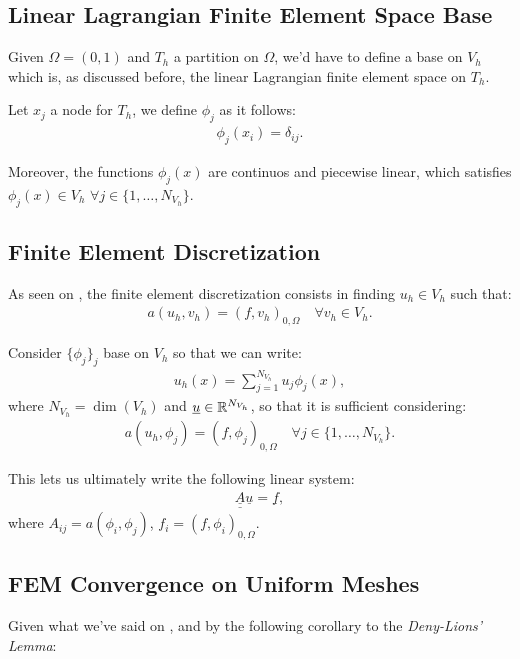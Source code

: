 \subsection{Linear Lagrangian Finite Element Space Base}

Given $\Omega = (0, 1)$ and $T_h$ a partition on $\Omega$, we'd have to define a base on $V_h$ which is, as discussed before, the linear Lagrangian finite element space on $T_h$.

Let $x_j$ a node for $T_h$, we define $\phi_j$ as it follows:
\begin{gather}
	\phi_j(x_i) = \delta_{ij}.
\end{gather}

Moreover, the functions $\phi_j(x)$ are continuos and piecewise linear, which satisfies $\phi_j(x) \in V_h$ $\forall j \in \{1, \dots, N_{V_h}\}$.

\subsection{Finite Element Discretization}
As seen on , the finite element discretization consists in finding $u_h \in V_h$ such that:
\begin{gather}
	a(u_h, v_h) = (f, v_h)_{0, \Omega} \quad \forall v_h \in V_h.
\end{gather}

Consider $\{\phi_j\}_j$ base on $V_h$ so that we can write:
\begin{gather}
	u_h(x) = \sum_{j = 1}^{N_{V_h}} u_j \phi_j(x),
\end{gather}
where $N_{V_h} = \dim(V_h)$ and $\underline{u} \in \mathbb{R}^{N_{V_h}}$, so that it is sufficient considering:
\begin{gather}
	a(u_h, \phi_j) = (f, \phi_j)_{0, \Omega} \quad \forall j \in \{1, \dots, N_{V_h}\}.
\end{gather}

This lets us ultimately write the following linear system:
\begin{gather}
	\underline{\underline{A}} \underline{u} = \underline{f},
\end{gather}
where $A_{ij} = a(\phi_i, \phi_j)$, $f_i = (f, \phi_i)_{0, \Omega}$.

\subsection{FEM Convergence on Uniform Meshes}

Given what we've said on , and by the following corollary to the \textit{Deny-Lions' Lemma}:

